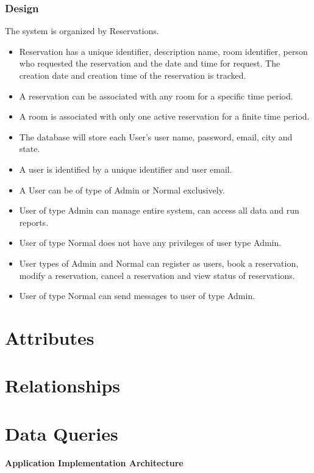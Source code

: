 \documentclass[11pt]{report}
\begin{document}
\subsubsection{Design}
The system is organized by Reservations. 
\begin{itemize}
\item Reservation has a unique identifier, description name, room identifier, person who requested the reservation and the date and time for request. The creation date and creation time of the reservation is tracked. \item A reservation can be associated with any room for a specific time period.
\item A room is associated with only one active reservation for a finite time period.
\item The database will store each User's user name, password, email, city and state.
\item A user is identified by a unique identifier and user email.
\item A User can be of type of Admin or Normal exclusively.
\item User of type Admin can manage entire system, can access all data and run reports.
\item User of type Normal does not have any privileges of user type Admin.
\item User types of Admin and Normal can register as users, book a reservation, modify a reservation, cancel a reservation and view status of reservations.
\item User of type Normal can send messages to user of type Admin.
\end{itemize}



\section*{Attributes}
\section*{Relationships}
\section*{Data Queries}
\paragraph{Application Implementation Architecture}
\end{document}
